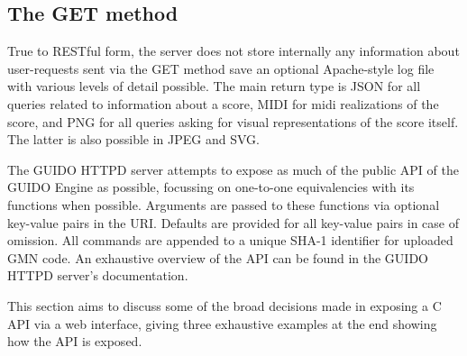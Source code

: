 \documentclass{article}
\begin{document}
\subsection{The GET method}
True to RESTful form, the server does not store internally any information about user-requests sent via the GET method save an optional Apache-style log file with various levels of detail possible.  The main return type is JSON for all queries related to information about a score, MIDI for midi realizations of the score, and PNG for all queries asking for visual representations of the score itself.  The latter is also possible in JPEG and SVG.\par
The GUIDO HTTPD server attempts to expose as much of the public API of the GUIDO Engine as possible, focussing on one-to-one equivalencies with its functions when possible.  Arguments are passed to these functions via optional key-value pairs in the URI.  Defaults are provided for all key-value pairs in case of omission.  All commands are appended to a unique SHA-1 identifier for uploaded GMN code. An exhaustive overview of the API can be found in the GUIDO HTTPD server's documentation\cite{guidoserverdoc}.\par
This section aims to discuss some of the broad decisions made in exposing a C API via a web interface, giving three exhaustive examples at the end showing how the API is exposed.
\end{document}
